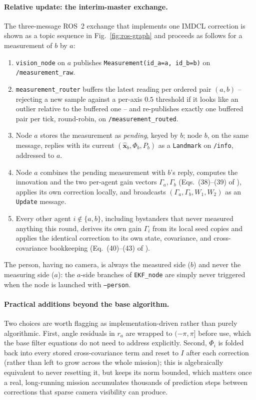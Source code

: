 \documentclass[10pt,conference]{IEEEtran}
\begin{document}
\paragraph{Relative update: the interim-master exchange.} The three-message ROS~2 exchange that
implements one IMDCL correction is shown as a topic sequence in Fig.~\ref{fig:ros-graph} and
proceeds as follows for a measurement of $b$ by $a$:
\begin{enumerate}
\item \texttt{vision\_node} on $a$ publishes \texttt{Measurement(id\_a=a, id\_b=b)} on
\texttt{/measurement\_raw}.
\item \texttt{measurement\_router} buffers the latest reading per ordered pair $(a,b)$ -- rejecting a new sample against a per-axis $0.5$ threshold if it looks like an outlier relative to the buffered one -- and re-publishes exactly one buffered pair per tick, round-robin, on \texttt{/measurement\_routed}.
\item Node $a$ stores the measurement as \emph{pending}, keyed by $b$; node $b$, on the same message, replies with its current $(\hat{\mathbf{x}}_b,\Phi_b,P_b)$ as a \texttt{Landmark} on \texttt{/info}, addressed to $a$.
\item Node $a$ combines the pending measurement with $b$'s reply, computes the innovation and the two per-agent gain vectors $\Gamma_a,\Gamma_b$ (Eqs.~(38)--(39) of \cite{kia2016}), applies its own correction locally, and broadcasts $(\Gamma_a,\Gamma_b, W_1, W_2)$ as an \texttt{Update} message.
\item Every other agent $i \notin\{a,b\}$, including bystanders that never measured anything this round, derives its own gain $\Gamma_i$ from its local seed copies and applies the identical correction to its own state, covariance, and cross-covariance bookkeeping (Eq.~(40)--(43) of \cite{kia2016}).
\end{enumerate}
The person, having no camera, is always the measured side ($b$) and never the measuring side
($a$): the $a$-side branches of \texttt{EKF\_node} are simply never triggered when the node is
launched with \texttt{--person}.

\paragraph{Practical additions beyond the base algorithm.} Two choices are worth flagging as
implementation-driven rather than purely algorithmic. First, angle residuals in
$r_a$ are wrapped to $(-\pi,\pi]$ before use, which the base filter equations do not need to
address explicitly. Second, $\Phi_i$ is folded back into every stored cross-covariance term and
reset to $I$ after each correction (rather than left to grow across the whole mission); this is
algebraically equivalent to never resetting it, but keeps its norm bounded, which matters once a
real, long-running mission accumulates thousands of prediction steps between corrections that
sparse camera visibility can produce.
\end{document}
